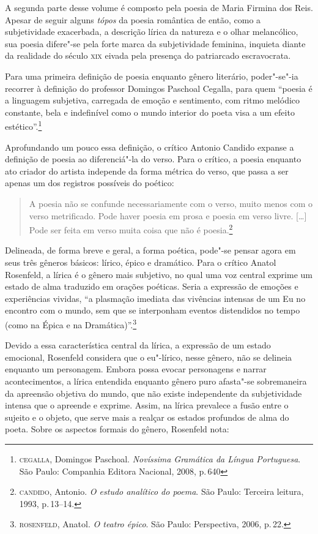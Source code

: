 A segunda parte desse volume é composto pela poesia de Maria Firmina dos Reis.
Apesar de seguir alguns \textit{tópos} da poesia romântica de então, como a subjetividade exacerbada, a descrição lírica da natureza e o olhar melancólico, 
sua poesia difere"-se pela forte marca da subjetividade feminina, inquieta diante da realidade do século \textsc{xix} eivada pela presença do patriarcado escravocrata.

Para uma primeira definição de poesia enquanto gênero literário, poder"-se"-ia recorrer à definição do professor Domingos Paschoal Cegalla, para quem ``poesia é a linguagem subjetiva, carregada de emoção e sentimento, com ritmo melódico constante, bela e indefinível como o mundo interior do poeta visa a um efeito estético''.\footnote{\textsc{cegalla}, Domingos Paschoal. \textit{Novíssima Gramática da Língua Portuguesa}. São Paulo: Companhia Editora Nacional, 2008, p.\,640}

Aprofundando um pouco essa definição, o crítico Antonio Candido expanse a definição de poesia ao diferenciá"-la do verso.
Para o crítico, a poesia enquanto ato criador do artista independe da forma métrica do verso, que passa a ser apenas um dos registros possíveis do poético:

\begin{quote}
A poesia não se confunde necessariamente com o verso, muito menos com o verso metrificado. Pode haver poesia em prosa e poesia em verso livre. [\ldots]
Pode ser feita em verso muita coisa que não é poesia.\footnote{\textsc{candido}, Antonio. \textit{O estudo analítico do poema}. São Paulo: Terceira leitura, 1993, p.\,13--14.}
\end{quote}

Delineada, de forma breve e geral, a forma poética, pode"-se pensar agora em seus três gêneros básicos: lírico, épico e dramático.
Para o crítico Anatol Rosenfeld, a lírica é o gênero mais subjetivo, no qual uma voz central exprime um estado de alma traduzido em orações poéticas.
Seria a expressão de emoções e experiências vividas, ``a plasmação imediata das vivências intensas de um Eu no encontro com o mundo, sem que se interponham eventos distendidos no tempo (como na Épica e na Dramática)''.\footnote{\textsc{rosenfeld}, Anatol. \textit{O teatro épico}. São Paulo: Perspectiva, 2006, p.\,22.}

Devido a essa característica central da lírica, a expressão de um estado emocional, Rosenfeld considera que o eu"-lírico, nesse gênero, não se delineia enquanto um personagem. Embora possa evocar personagens e narrar acontecimentos, a lírica entendida enquanto gênero puro afasta"-se sobremaneira da apreensão objetiva do mundo, que não existe independente da subjetividade intensa que o apreende e exprime. Assim, na lírica prevalece a fusão entre o sujeito e o objeto, que serve mais a realçar os estados profundos de alma do poeta.
Sobre os aspectos formais do gênero, Rosenfeld nota:

